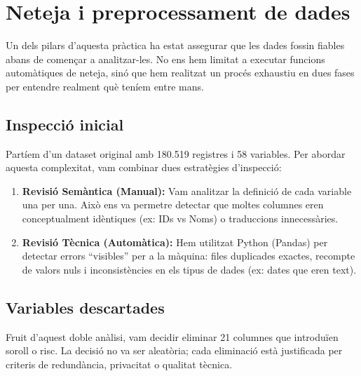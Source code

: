 \documentclass[12pt,a4paper]{article}
\begin{document}
\section{Neteja i preprocessament de dades}
Un dels pilars d'aquesta pràctica ha estat assegurar que les dades fossin fiables abans de començar a analitzar-les. No ens hem limitat a executar funcions automàtiques de neteja, sinó que hem realitzat un procés exhaustiu en dues fases per entendre realment què teníem entre mans.
\subsection{Inspecció inicial}
Partíem d'un dataset original amb 180.519 registres i 58 variables. Per abordar aquesta complexitat, vam combinar dues estratègies d'inspecció:

\begin{enumerate}
    \item \textbf{Revisió Semàntica (Manual):} Vam analitzar la definició de cada variable una per una. Això ens va permetre detectar que moltes columnes eren conceptualment idèntiques (ex: IDs vs Noms) o traduccions innecessàries.
    \item \textbf{Revisió Tècnica (Automàtica):} Hem utilitzat Python (Pandas) per detectar errors ``visibles'' per a la màquina: files duplicades exactes, recompte de valors nuls i inconsistències en els tipus de dades (ex: dates que eren text).
\end{enumerate}
\subsection{Variables descartades}
Fruit d'aquest doble anàlisi, vam decidir eliminar 21 columnes que introduïen soroll o risc. La decisió no va ser aleatòria; cada eliminació està justificada per criteris de redundància, privacitat o qualitat tècnica.
\end{document}
